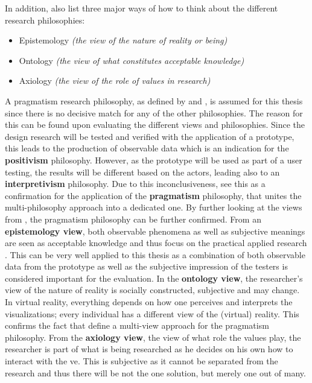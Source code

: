 In addition, \cite{Saunders2009} also list three major ways of how to think about the different research philosophies:
\begin{itemize}[noitemsep,nolistsep]
	\item Epistemology \textit{(the view of the nature of reality or being)}
	\item Ontology \textit{(the view of what constitutes acceptable knowledge)}
	\item Axiology \textit{(the view of the role of values in research)}
\end{itemize}

A pragmatism research philosophy, as defined by \cite{Vaishnavi2008} and \cite{Saunders2009}, is assumed for this thesis since there is no decisive match for any of the other philosophies. The reason for this can be found upon evaluating the different views and philosophies. \newline
Since the design research will be tested and verified with the application of a prototype, this leads to the production of observable data which is an indication for the \textbf{positivism} philosophy. However, as the prototype will be used as part of a user testing, the results will be different based on the actors, leading also to an \textbf{interpretivism} philosophy. Due to this inconclusiveness, \cite{Saunders2009} see this as a confirmation for the application of the \textbf{pragmatism} philosophy, that unites the multi-philosophy approach into a dedicated one. \newline
By further looking at the views from \cite{Saunders2009}, the pragmatism philosophy can be further confirmed. From an \textbf{epistemology view}, both observable phenomena as well as subjective meanings are seen as acceptable knowledge and thus focus on the practical applied research \citep{Saunders2009}. This can be very well applied to this thesis as a combination of both observable data from the prototype as well as the subjective impression of the testers is considered important for the evaluation. In the \textbf{ontology view}, the researcher's view of the nature of reality is socially constructed, subjective and may change. In virtual reality, everything depends on how one perceives and interprets the visualizations; every individual has a different view of the (virtual) reality. This confirms the fact that \cite{Saunders2009} define a multi-view approach for the pragmatism philosophy. From the \textbf{axiology view}, the view of what role the values play, the researcher is part of what is being researched as he decides on his own how to interact with the \gls{ve}. This is subjective as it cannot be separated from the research and thus there will be not the one solution, but merely one out of many. 



